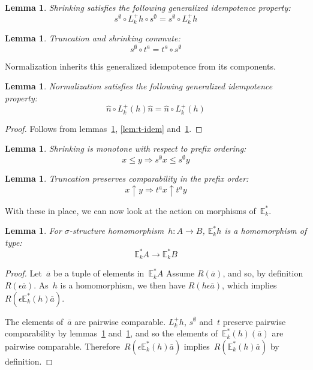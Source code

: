 \documentclass{article}
\theoremstyle{plain}
\newtheorem{lemma}[theorem]{Lemma}
\theoremstyle{definition}
\theoremstyle{remark}
\numberwithin{theorem}{section}
\begin{document}
\begin{lemma}
\label{lem:s-idem}
Shrinking satisfies the following generalized idempotence property:
\begin{equation*}
    s^\emptyset \circ L^+_k h \circ s^\emptyset = s^\emptyset \circ L^+_k h
\end{equation*}
\end{lemma}
\begin{lemma}
\label{lem:t-s-commute}
Truncation and shrinking commute:
\begin{equation*}
    s^\emptyset \circ t^a = t^a \circ s^\emptyset
\end{equation*}
\end{lemma}
Normalization inherits this generalized idempotence from its components.
\begin{lemma}
\label{lem:n-idem}
Normalization satisfies the following generalized idempotence property:
\begin{equation*}
    \hat{n} \circ L^+_k(h) \hat{n} = \hat{n} \circ L^+_k(h)
\end{equation*}
\end{lemma}
\begin{proof}
    Follows from lemmas~\ref{lem:s-idem}, \ref{lem:t-idem} and~\ref{lem:t-s-commute}.
\end{proof}
\begin{lemma}
\label{lem:s-monotone}
Shrinking is monotone with respect to prefix ordering:
\begin{equation*}
    x \leq y \Rightarrow s^\emptyset x \leq s^\emptyset y
\end{equation*}
\end{lemma}
\begin{lemma}
\label{lem:t-pres-comparability}
Truncation preserves comparability in the prefix order:
\begin{equation*}
    x \uparrow y \Rightarrow t^a x \uparrow t^a y
\end{equation*}
\end{lemma}
With these in place, we can now look at the action on morphisms of~$\mathbb{E}^*_k$.
\begin{lemma}
For $\sigma$-structure homomorphism~$h : A \rightarrow B$, $\mathbb{E}^*_k h$ is a homomorphism of type:
\begin{equation*}
    \mathbb{E}^*_k A \rightarrow \mathbb{E}^*_k B
\end{equation*}
\end{lemma}
\begin{proof}
Let~$\overline{a}$ be a tuple of elements in~$\mathbb{E}^*_k A$
Assume $R(\overline{a})$, and so, by definition $R(\epsilon\overline{a})$. As~$h$ is a homomorphism, we then have $R(h\epsilon\overline{a})$, which implies~$R(\epsilon\mathbb{E}^*_k(h)\overline{a})$.

The elements of~$\overline{a}$ are pairwise comparable. $L^+_k h$, $s^\emptyset$ and~$t$ preserve pairwise comparability by lemmas~\ref{lem:s-monotone} and~\ref{lem:t-pres-comparability}, and so the elements of~$\mathbb{E}^*_k(h)(\overline{a})$ are pairwise comparable. Therefore~$R(\epsilon\mathbb{E}^*_k(h)\overline{a})$ implies~$R(\mathbb{E}^*_k(h)\overline{a})$ by definition.
\end{proof}
\end{document}

